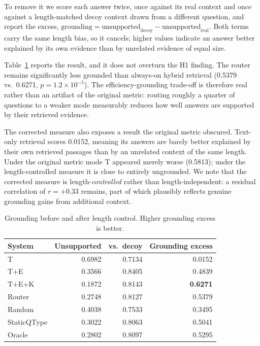 \documentclass[conference]{IEEEtran}
\begin{document}
To remove it we score each answer twice, once against its real context
and once against a length-matched decoy context drawn from a different
question, and report the excess,
$\text{grounding} = \text{unsupported}_{\text{decoy}} -
\text{unsupported}_{\text{real}}$. Both terms carry the same length
bias, so it cancels; higher values indicate an answer better explained
by its own evidence than by unrelated evidence of equal size.

Table~\ref{tab:grounding} reports the result, and it does not overturn
the H1 finding. The router remains significantly less grounded than
always-on hybrid retrieval (0.5379 vs.\ 0.6271,
$p = 1.2\times10^{-5}$). The efficiency-grounding trade-off is
therefore real rather than an artifact of the original metric: routing
roughly a quarter of questions to a weaker mode measurably reduces how
well answers are supported by their retrieved evidence.

The corrected measure also exposes a result the original metric
obscured. Text-only retrieval scores 0.0152, meaning its answers are
barely better explained by their own retrieved passages than by an
unrelated context of the same length. Under the original metric mode T
appeared merely worse (0.5813); under the length-controlled measure it
is close to entirely ungrounded. We note that the corrected measure is
length-\textit{controlled} rather than length-independent: a residual
correlation of $r = +0.33$ remains, part of which plausibly reflects
genuine grounding gains from additional context.

\begin{table}[t]
\centering
\footnotesize
\setlength{\tabcolsep}{4pt}
\caption{Grounding before and after length control. Higher grounding excess is better.}
\label{tab:grounding}
\begin{tabular}{lrrr}
\toprule
System & Unsupported & vs.\ decoy & Grounding excess \\
\midrule
T           & 0.6982 & 0.7134 & 0.0152 \\
T+E         & 0.3566 & 0.8405 & 0.4839 \\
T+E+K       & 0.1872 & 0.8143 & \textbf{0.6271} \\
Router      & 0.2748 & 0.8127 & 0.5379 \\
Random      & 0.4038 & 0.7533 & 0.3495 \\
StaticQType & 0.3022 & 0.8063 & 0.5041 \\
Oracle      & 0.2802 & 0.8097 & 0.5295 \\
\bottomrule
\end{tabular}
\end{table}
\end{document}
